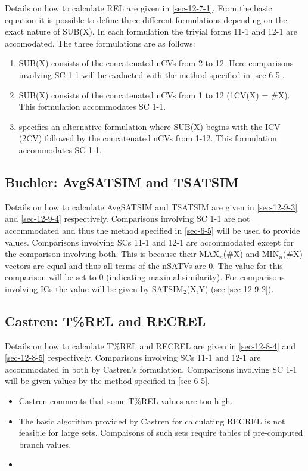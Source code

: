 \documentclass{article}
\begin{document}
Details on how to calculate REL are given in \ref{sec-12-7-1}. From the basic
equation it is possible to define three different formulations
depending on the exact nature of SUB(X). In each formulation the
trivial forms 11-1 and 12-1 are accomodated. The three formulations
are as follows:
\begin{enumerate}
\item SUB(X) consists of the concatenated nCVs from 2 to 12. Here
   comparisons involving SC 1-1 will be evalueted with the method
   specified in \ref{sec-6-5}.
\item SUB(X) consists of the concatenated nCVs from 1 to 12 (1CV(X)
   = \#X). This formulation accommodates SC 1-1.
\item \citet{Martorell2013} specifies an alternative formulation where
   SUB(X) begins with the ICV (2CV) followed by the concatenated nCVs
   from 1-12. This formulation accommodates SC 1-1.
\end{enumerate}
\subsection{Buchler: AvgSATSIM and TSATSIM}
\label{sec-7-3}

Details on how to calculate AvgSATSIM and TSATSIM are given in
\ref{sec-12-9-3} and \ref{sec-12-9-4} respectively. Comparisons involving SC 1-1 are
not accommodated and thus the method specified in \ref{sec-6-5} will
be used to provide values. Comparisons involving SCs 11-1 and 12-1 are
accommodated except for the comparison involving both. This is because
their MAX$_{n}$(\#X) and MIN$_{n}$(\#X) vectors are equal and thus all terms
of the nSATVs are 0. The value for this comparison will be set to 0
(indicating maximal similarity). For comparisons involving ICs the
value will be given by SATSIM$_{2}$(X,Y) (see \ref{sec-12-9-2}).
\subsection{Castren: T\%REL and RECREL}
\label{sec-7-4}

Details on how to calculate T\%REL and RECREL are given in \ref{sec-12-8-4} and
\ref{sec-12-8-5} respectively. Comparisons involving SCs 11-1 and 12-1 are
accommodated in both by Castren's formulation. Comparisons involving
SC 1-1 will be given values by the method specified in \ref{sec-6-5}.

\begin{itemize}
\item Castren comments that some T\%REL values are too high.
\item The basic algorithm provided by Castren for calculating RECREL is
  not feasible for large sets. Compaisons of such sets require tables
  of pre-computed branch values.
\item 
\end{itemize}
\end{document}

